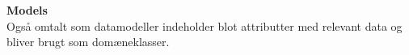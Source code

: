 \textbf{Models}\\
Også omtalt som datamodeller indeholder blot attributter med relevant data og bliver brugt som domæneklasser.\\\\